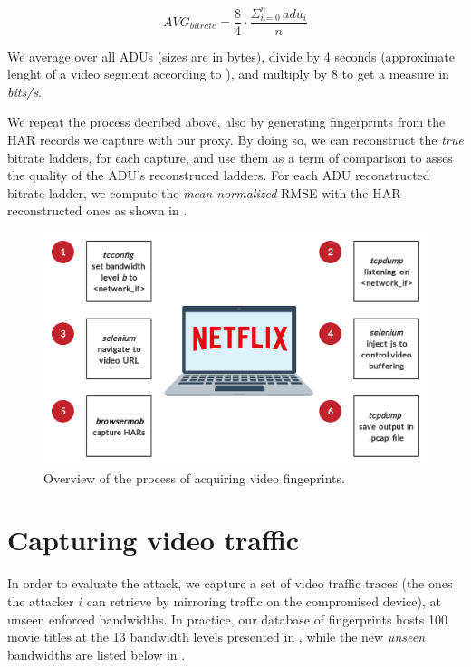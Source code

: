 \begin{equation*}
    AVG_{bitrate} = \dfrac{8}{4} \cdot \dfrac{\Sigma_{i=0}^{n} \hspace{2pt} adu_i}{n}
\end{equation*}

We average over all ADUs (sizes are in bytes), divide by 4 seconds (approximate
lenght of a video segment according to \cite{netflix-real-time}), and multiply
by 8 to get a measure in \emph{bits/s}. 

We repeat the process decribed above, also by generating fingerprints from the
HAR records we capture with our proxy. By doing so, we can reconstruct the
\emph{true} bitrate ladders, for each capture, and use them as a term of
comparison to asses the quality of the ADU's reconstruced ladders. For each
ADU reconstructed bitrate ladder, we compute the \emph{mean-normalized} RMSE
with the HAR reconstructed ones as shown in .

\begin{figure}[!h]
  \centering
  \includegraphics[width=\columnwidth]{img/fingerprints.png}
  \caption{Overview of the process of acquiring video fingeprints.}
  \label{fig:fingerprints}
\end{figure}


\section{Capturing video traffic}

In order to evaluate the attack, we capture a set of video traffic traces (the
ones the attacker $i$ can retrieve by mirroring traffic on the compromised
device), at unseen enforced bandwidths. In practice, our database of
fingerprints hosts 100 movie titles at the 13 bandwidth levels presented in
, while the new \emph{unseen} bandwidths are listed below
in .

